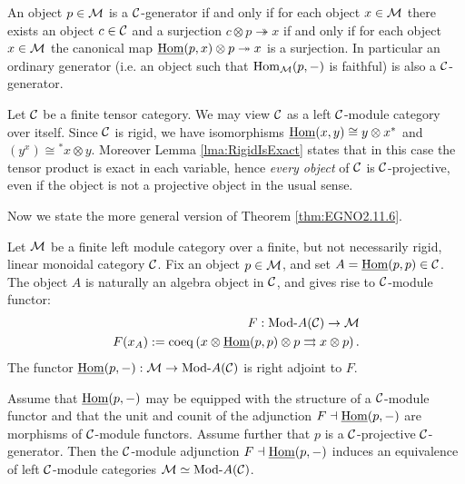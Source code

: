 \documentclass{amsart}
\begin{document}
\begin{remark}
	An object $p \in \mathcal M$ is a $\mathcal C$-generator if and only if for each object $x \in \mathcal M$ there exists an object $c \in \mathcal C$ and a surjection $c \otimes p \twoheadrightarrow x$ if and only if for each object $x \in \mathcal M$ the canonical map $\operatorname{\underline{Hom}}(p,x) \otimes p \twoheadrightarrow x$ is a surjection. In particular an ordinary generator (i.e. an object such that $\operatorname{Hom}_\mathcal M(p,-)$ is faithful) is also a $\mathcal C$-generator. 
\end{remark}

\begin{example} \label{ex:rigid_all_C-proj}
	Let $\mathcal C$ be a finite tensor category. We may view $\mathcal C$ as a left $\mathcal C$-module category over itself. Since $\mathcal C$ is rigid, we have isomorphisms $\operatorname{\underline{Hom}}(x,y) \cong y \otimes x^*$ and $(y^x) \cong {}^*x \otimes y$. Moreover Lemma \ref{lma:RigidIsExact} states that in this case the tensor product is exact in each variable, hence {\em every object} of $\mathcal C$ is $\mathcal C$-projective, even if the object is not a projective object in the usual sense. %
\end{example}

Now we state the more general version of Theorem \ref{thm:EGNO2.11.6}.

\begin{theorem} \label{thm:C-module-Embedding} %
	Let $\mathcal M$ be a finite left module category over a finite, but not necessarily rigid, linear monoidal category $\mathcal C$. Fix an object $p \in \mathcal M$, and set $A = \operatorname{\underline{Hom}}(p,p) \in \mathcal C$. The object $A$ is naturally an algebra object in $\mathcal C$, and gives rise to $\mathcal C$-module functor:
	\begin{align*}
		F:   \Mod{}{A}(\cC) \to \cM \\
		F(x_A) := \coeq \left( x \otimes \IHom(p,p) \otimes p \rightrightarrows x \otimes p \right).
	\end{align*}
The functor $\IHom(p,-): \cM \to \Mod{}{A}(\cC)$ is right adjoint to $F$. 

Assume that $\operatorname{\underline{Hom}}(p,-)$ may be equipped with the structure of a $\mathcal C$-module functor and that the unit and counit of the adjunction $F \dashv \operatorname{\underline{Hom}}(p,-)$ are morphisms of $\mathcal C$-module functors. Assume further that $p$ is a $\mathcal C$-projective $\mathcal C$-generator.  Then the $\mathcal C$-module adjunction  $F \dashv \operatorname{\underline{Hom}}(p,-)$
	induces an equivalence of left $\mathcal C$-module categories $\cM \simeq \Mod{}{A}(\cC)$. 
\end{theorem}
\end{document}
